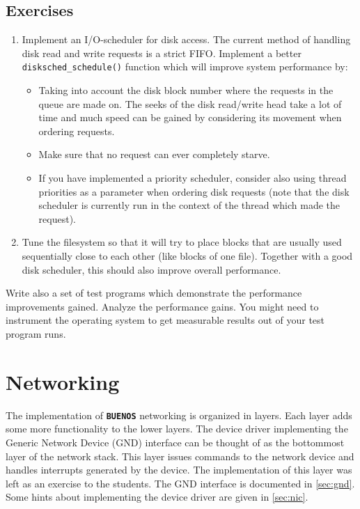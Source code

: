 \documentclass[twoside,a4paper]{report}
\newcommand{\buenos}{\texttt{\textbf{BUENOS}}}
\newenvironment{exercises}[1][\addcontentsline{toc}{section}{Exercises}%
\section*{Exercises}\markright{EXERCISES}]{%
#1%
\begin{enumerate}%
}{%
\end{enumerate}
}
\begin{document}
\begin{exercises}
{\begin{enumerate}
\item Implement an I/O-scheduler for disk access. The current method
of handling disk read and write requests is a strict FIFO. Implement a
better \texttt{disksched\_schedule()} function which will improve
system performance by:

\begin{itemize}

\item Taking into account the disk block number where the requests in the
queue are made on. The seeks of the disk read/write head take a lot of
time and much speed can be gained by considering its movement when
ordering requests.

\item Make sure that no request can ever completely starve.

\item If you have implemented a priority scheduler, consider also
using thread priorities as a parameter when ordering disk requests
(note that the disk scheduler is currently run in the context of the thread
which made the request).

\end{itemize}

\item Tune the filesystem so that it will try to place blocks that are
usually used sequentially close to each other (like blocks of one
file). Together with a good disk scheduler, this should also improve
overall performance.

\end{enumerate}

Write also a set of test programs which demonstrate the performance
improvements gained. Analyze the performance gains. You might need to
instrument the operating system to get measurable results out of
your test program runs.}

\end{exercises}


\chapter{Networking}
\label{sec:network}


The implementation of \buenos{} networking is organized in
layers. Each layer adds some more functionality to the lower
layers. The device driver implementing the Generic Network Device
(GND) interface can be thought of as the bottommost layer of the
network stack. This layer issues commands to the network device and
handles interrupts generated by the device. The implementation of this
layer was left as an exercise to the students. The GND interface is
documented in \autoref{sec:gnd}. Some hints about implementing the
device driver are given in \autoref{sec:nic}.
\end{document}
